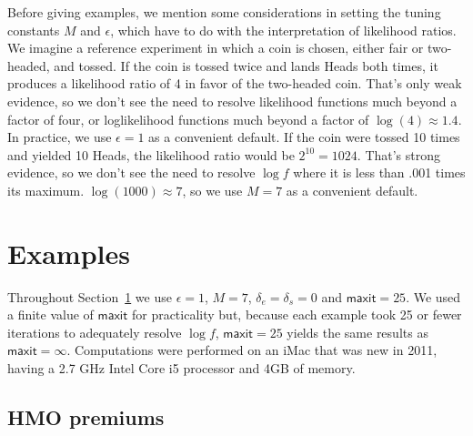 \documentclass{report}
\newcommand{\textcompute}{\textsf}
\newcommand{\RL}{f}
\newcommand{\logRL}{\log\RL}
\newcommand{\maxit}{\textcompute{maxit}}
\begin{document}
Before giving examples, we mention some considerations in setting the tuning constants $M$ and $\epsilon$, which have to do with the interpretation of likelihood ratios.  We imagine a reference experiment in which a coin is chosen, either fair or two-headed, and tossed.  If the coin is tossed twice and lands Heads both times, it produces a likelihood ratio of 4 in favor of the two-headed coin.  That's only weak evidence, so we don't see the need to resolve likelihood functions much beyond a factor of four, or loglikelihood functions much beyond a factor of $\log(4) \approx 1.4$.  In practice, we use $\epsilon = 1$ as a convenient default.  If the coin were tossed 10 times and yielded 10 Heads, the likelihood ratio would be $2^{10} = 1024$.  That's strong evidence, so we don't see the need to resolve $\logRL$ where it is less than .001 times its maximum.  $\log(1000) \approx 7$, so we use $M = 7$ as a convenient default.


\section{Examples}
\label{sec:examp}
Throughout Section~\ref{sec:examp} we use $\epsilon = 1$, $M = 7$, $\delta_e = \delta_s = 0$ and $\maxit = 25$.  We used a finite value of $\maxit$ for practicality but, because each example took 25 or fewer iterations to adequately resolve $\log f$, $\maxit = 25$ yields the same results as $\maxit = \infty$.  Computations were performed on an iMac that was new in 2011, having a 2.7 GHz Intel Core i5 processor and 4GB of memory.
\subsection{HMO premiums}
\end{document}
